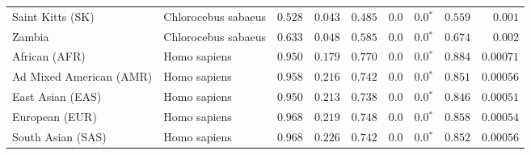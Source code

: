 \begin{center}
\begin{adjustbox}{width = 1\textwidth}
\begin{tabular}{|l|l|r|r|r|r|r|r|r|}
            Saint Kitts (SK)                  & Chlorocebus sabaeus        & $ 0.528$ & $ 0.043$ & $ 0.485$ & $0.0$    & $\bm{0.0{^*}}$ & $ 0.559$ & $ 0.001$ \\
            Zambia        & Chlorocebus sabaeus        & $ 0.633$ & $ 0.048$ & $ 0.585$ & $0.0$    & $\bm{0.0{^*}}$ & $ 0.674$ & $ 0.002$ \\
            African (AFR)               & Homo sapiens        & $ 0.950$ & $ 0.179$ & $ 0.770$ & $0.0$    & $\bm{0.0{^*}}$ & $ 0.884$ & $0.00071$ \\
            Ad Mixed American (AMR)                 & Homo sapiens        & $ 0.958$ & $ 0.216$ & $ 0.742$ & $0.0$    & $\bm{0.0{^*}}$ & $ 0.851$ & $0.00056$ \\
            East Asian (EAS)              & Homo sapiens        & $ 0.950$ & $ 0.213$ & $ 0.738$ & $0.0$    & $\bm{0.0{^*}}$ & $ 0.846$ & $0.00051$ \\
            European (EUR)              & Homo sapiens        & $ 0.968$ & $ 0.219$ & $ 0.748$ & $0.0$    & $\bm{0.0{^*}}$ & $ 0.858$ & $0.00054$ \\
            South Asian (SAS)              & Homo sapiens        & $ 0.968$ & $ 0.226$ & $ 0.742$ & $0.0$    & $\bm{0.0{^*}}$ & $ 0.852$ & $0.00056$ \\
            \bottomrule
        \end{tabular}
    \end{adjustbox}
\end{center}

